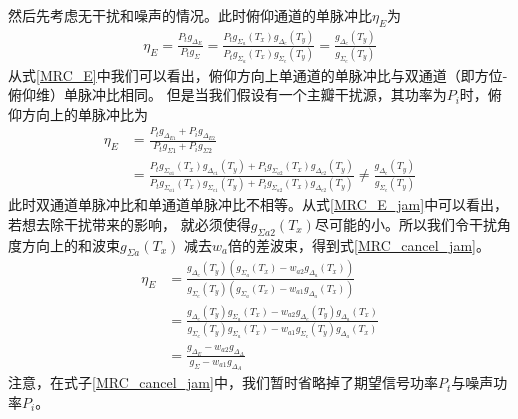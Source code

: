 \documentclass[master]{thesis-uestc}
\begin{document}
然后先考虑无干扰和噪声的情况。此时俯仰通道的单脉冲比$\eta_E$为
\begin{equation}\label{MRC_E}
    \begin{aligned}
        \eta_{E}=\frac{P_{t} g_{\Delta_{E}}}{P_{t} g_{\Sigma}}
                =\frac{P_{t} g_{\Sigma_{a}}\left(T_{x}\right) g_{\Delta_{e}}\left(T_{y}\right)}
                      {P_{t} g_{\Sigma_{a}}\left(T_{x}\right) g_{\Sigma_{e}}\left(T_{y}\right)}
                =\frac{g_{\Delta_{e}}\left(T_{y}\right)}{g_{\Sigma_{e}}\left(T_{y}\right)}
    \end{aligned}
\end{equation}
从式\eqref{MRC_E}中我们可以看出，俯仰方向上单通道的单脉冲比与双通道（即方位-俯仰维）单脉冲比相同。
但是当我们假设有一个主瓣干扰源，其功率为$P_i$时，俯仰方向上的单脉冲比为
\begin{equation}\label{MRC_E_jam}
    \begin{aligned}
        \eta_{E}&=\frac{P_{t} g_{\Delta_{E 1}}+P_{i} g_{\Delta_{E 2}}}{P_{t} g_{\Sigma 1}+P_{i} g_{\Sigma 2}} \\
                &=\frac{P_{t} g_{\Sigma_{a1}}\left(T_{x}\right) g_{\Delta_{e 1}}\left(T_{y}\right)+P_{i} 
                        g_{\Sigma_{a 2}}\left(T_{x}\right) g_{\Delta_{e 2}}\left(T_{y}\right)}
                       {P_{t} g_{\Sigma_{a 1}}\left(T_{x}\right) g_{\Sigma_{e 1}}\left(T_{y}\right)+P_{i} 
                        g_{\Sigma_{a 2}}\left(T_{x}\right) g_{\Delta_{e 2}}\left(T_{y}\right)} 
                \neq \frac{g_{\Delta_{e}}\left(T_{y}\right)}{g_{\Sigma_{e}}\left(T_{y}\right)}
    \end{aligned}
\end{equation}
此时双通道单脉冲比和单通道单脉冲比不相等。从式\eqref{MRC_E_jam}中可以看出，若想去除干扰带来的影响，
就必须使得$g_{\Sigma a2}(T_x)$尽可能的小。所以我们令干扰角度方向上的和波束$g_{\Sigma a}(T_x)$
减去$w_a$倍的差波束，得到式\eqref{MRC_cancel_jam}。
\begin{equation}\label{MRC_cancel_jam}
    \begin{aligned}
        \eta_E &= \frac{g_{\Delta_{e}}\left(T_{y}\right)\left(g_{\Sigma_{a}}\left(T_{x}\right)-
                        w_{a 2} g_{\Delta_{a}}\left(T_{x}\right)\right)}
                       {g_{\Sigma_{e}}\left(T_{y}\right)\left(g_{\Sigma_{a}}\left(T_{x}\right)-
                        w_{a 1} g_{\Delta_{a}}\left(T_{x}\right)\right)} \\
               &= \frac{g_{\Delta_{e}}\left(T_{y}\right) g_{\Sigma_{a}}\left(T_{x}\right)-
                        w_{a 2} g_{\Delta_{e}}\left(T_{y}\right) g_{\Delta_{a}}\left(T_{x}\right)}
                       {g_{\Sigma_{e}}\left(T_{y}\right) g_{\Sigma_{a}}\left(T_{x}\right)-
                        w_{a 1} g_{\Sigma_{e}}\left(T_{y}\right) g_{\Delta_{a}}\left(T_{x}\right)} \\
               &= \frac{g_{\Delta_{E}}-w_{a 2} g_{\Delta_{\Delta}}}{g_{\Sigma}-w_{a 1} g_{\Delta_{A}}}
    \end{aligned}
\end{equation}
注意，在式子\eqref{MRC_cancel_jam}中，我们暂时省略掉了期望信号功率$P_t$与噪声功率$P_i$。
\end{document}
